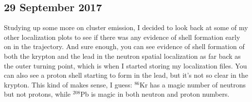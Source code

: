 \subsection*{29 September 2017}
Studying up some more on cluster emission, I decided to look back at some of my other localization plots to see if there was any evidence of shell formation early on in the trajectory. And sure enough, you can see evidence of shell formation of both the krypton and the lead in the neutron spatial localization as far back as the outer turning point, which is when I started storing my localization files. You can also see a proton shell starting to form in the lead, but it's not so clear in the krypton. This kind of makes sense, I guess: $^{86}$Kr has a magic number of neutrons but not protons, while $^{208}$Pb is magic in both neutron and proton numbers.

